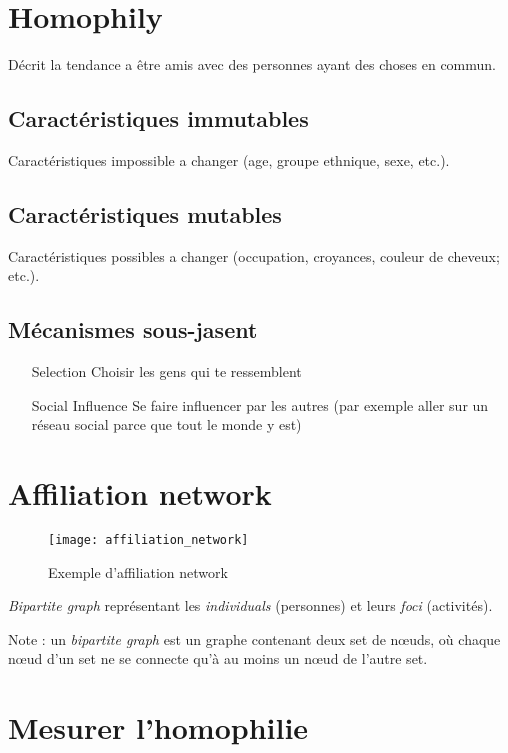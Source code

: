 \section{Homophily}

Décrit la tendance a être amis avec des personnes ayant des choses en commun.

\subsection{Caractéristiques immutables}

Caractéristiques impossible a changer (age, groupe ethnique, sexe, etc.).

\subsection{Caractéristiques mutables}

Caractéristiques possibles a changer (occupation, croyances, couleur de cheveux; etc.).

\subsection{Mécanismes sous-jasent}

\begin{itemize}
	\item[Selection] Choisir les gens qui te ressemblent
	\item[Social Influence] Se faire influencer par les autres (par exemple aller sur un réseau social parce que tout le monde y est) 
\end{itemize}

\section{Affiliation network}

\begin{figure}[H]
    \centering
    \texttt{[image: affiliation\_network]}
    \caption{Exemple d'affiliation network}
\end{figure}

\textit{Bipartite graph} représentant les \textit{individuals} (personnes) et leurs \textit{foci} (activités).

Note : un \textit{bipartite graph} est un graphe contenant deux set de nœuds, où chaque nœud d'un set ne se connecte qu'à au moins un nœud de l'autre set.

\section{Mesurer l'homophilie}

